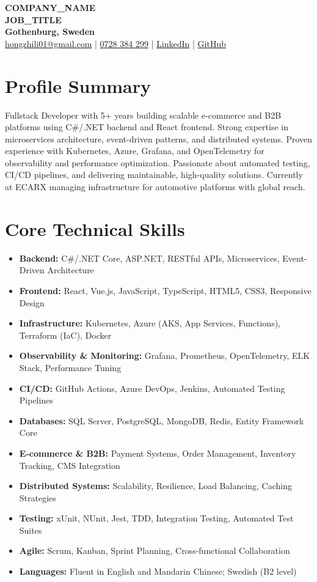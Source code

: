 \documentclass[10pt,a4paper]{article}
\begin{document}
\pagestyle{empty}

\begin{center}
{\Large \textbf{COMPANY\_NAME}}\\[4pt]
{\Large \textbf{JOB\_TITLE}}\\[4pt]
{\Large \textbf{Gothenburg, Sweden}}\\[8pt]
\textcolor{linkedinblue}{\href{mailto:hongzhili01@gmail.com}{hongzhili01@gmail.com} | \href{tel:0728384299}{0728 384 299} | \href{https://www.linkedin.com/in/harvad/}{LinkedIn} | \href{https://github.com/bluehawana}{GitHub}}
\end{center}
\vspace{8pt}

\section*{Profile Summary}
Fullstack Developer with 5+ years building scalable e-commerce and B2B platforms using C\#/.NET backend and React frontend. Strong expertise in microservices architecture, event-driven patterns, and distributed systems. Proven experience with Kubernetes, Azure, Grafana, and OpenTelemetry for observability and performance optimization. Passionate about automated testing, CI/CD pipelines, and delivering maintainable, high-quality solutions. Currently at ECARX managing infrastructure for automotive platforms with global reach.

\section*{Core Technical Skills}
\begin{itemize}[noitemsep]
\item \textbf{Backend:} C\#/.NET Core, ASP.NET, RESTful APIs, Microservices, Event-Driven Architecture
\item \textbf{Frontend:} React, Vue.js, JavaScript, TypeScript, HTML5, CSS3, Responsive Design
\item \textbf{Infrastructure:} Kubernetes, Azure (AKS, App Services, Functions), Terraform (IaC), Docker
\item \textbf{Observability \& Monitoring:} Grafana, Prometheus, OpenTelemetry, ELK Stack, Performance Tuning
\item \textbf{CI/CD:} GitHub Actions, Azure DevOps, Jenkins, Automated Testing Pipelines
\item \textbf{Databases:} SQL Server, PostgreSQL, MongoDB, Redis, Entity Framework Core
\item \textbf{E-commerce \& B2B:} Payment Systems, Order Management, Inventory Tracking, CMS Integration
\item \textbf{Distributed Systems:} Scalability, Resilience, Load Balancing, Caching Strategies
\item \textbf{Testing:} xUnit, NUnit, Jest, TDD, Integration Testing, Automated Test Suites
\item \textbf{Agile:} Scrum, Kanban, Sprint Planning, Cross-functional Collaboration
\item \textbf{Languages:} Fluent in English and Mandarin Chinese; Swedish (B2 level)
\end{itemize}
\end{document}
